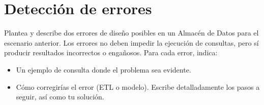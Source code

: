 



        

\section{Detección de errores}

Plantea y describe dos errores de diseño posibles en un Almacén de Datos para el escenario anterior. Los errores no deben impedir la ejecución de consultas, pero sí producir resultados incorrectos o engañosos. Para cada error, indica:

    \begin{itemize}
        \item Un ejemplo de consulta donde el problema sea evidente.
        \item Cómo corregirías el error (ETL o modelo). Escribe detalladamente los pasos a seguir,
        así como tu solución.
    \end{itemize}


